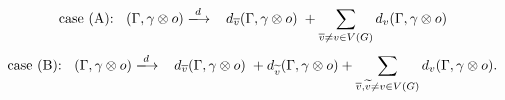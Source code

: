 \[ \text{case (A): \;\;} (\Gamma,\gamma\otimes o) \xlongrightarrow{d} \hspace{.3cm} d_{\bar{v}}(\Gamma,\gamma\otimes o) \hspace{.1cm}  + \sum_{\bar{v}\neq v\in V(G)} d_v(\Gamma,\gamma\otimes o) \]
\[ \text{case (B): \;\;} (\Gamma,\gamma\otimes o) \xlongrightarrow{d} \hspace{.3cm} d_{\bar{v}}(\Gamma,\gamma\otimes o) \hspace{.1cm}  + d_{\tilde{v}}(\Gamma,\gamma\otimes o) +\sum_{\bar{v},\tilde{v}\neq v\in V(G)} d_v(\Gamma,\gamma\otimes o). \]
